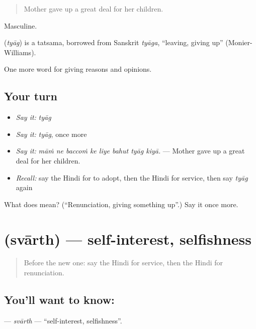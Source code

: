 \begin{quote}
Mother gave up a great deal for her children.
\end{quote}

Masculine.

\begin{cousinweb}
\textbf{} (\emph{tyāg}) is a tatsama, borrowed from Sanskrit \emph{tyāga}, \textquotedblleft{}leaving, giving up\textquotedblright{} (Monier-Williams).
\end{cousinweb}

\begin{grammarlens}[title={What you've built}]
One more word for giving reasons and opinions.
\end{grammarlens}

\subsection*{Your turn}
\begin{itemize}
\raggedright
  \item \emph{Say it:} \emph{tyāg}
  \item \emph{Say it:} \emph{tyāg}, once more
  \item \emph{Say it:} \emph{māṁ ne baccoṁ ke liye bahut tyāg kiyā.} — Mother gave up a great deal for her children.
  \item \emph{Recall:} say the Hindi for to adopt, then the Hindi for service, then say \emph{tyāg} again
\end{itemize}

\begin{tcolorbox}[breakable,colback=teal!4,colframe=teal!35!black,title={Before you move on}]
What does  mean? (\textquotedblleft{}Renunciation, giving something up\textquotedblright{}.) Say it once more.
\end{tcolorbox}
\section[\texorpdfstring{\hi{स्वार्थ} (svārth)}{स्वार्थ (svārth)}]{ (svārth) — self-interest, selfishness}

\label{lesson:HI-C358-svarth}



\begin{quote}
Before the new one: say the Hindi for service, then the Hindi for renunciation.
\end{quote}

\subsection*{You'll want to know: }
\textbf{} — \emph{svārth} — \textquotedblleft{}self-interest, selfishness\textquotedblright{}.

